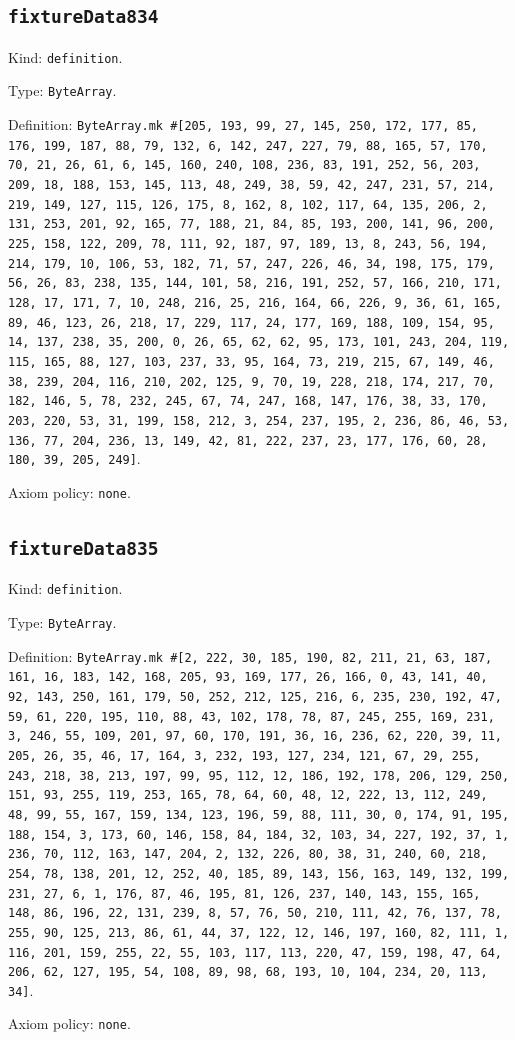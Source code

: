 \documentclass[11pt]{article}
\begin{document}
\subsection*{\texttt{fixtureData834}}
\noindent Kind: \texttt{definition}.\par
\noindent Type: \texttt{ByteArray}.\par
\noindent Definition: \texttt{ByteArray.mk \#[205, 193, 99, 27, 145, 250, 172, 177, 85, 176, 199, 187, 88, 79, 132, 6, 142, 247, 227, 79, 88, 165, 57, 170, 70, 21, 26, 61, 6, 145, 160, 240, 108, 236, 83, 191, 252, 56, 203, 209, 18, 188, 153, 145, 113, 48, 249, 38, 59, 42, 247, 231, 57, 214, 219, 149, 127, 115, 126, 175, 8, 162, 8, 102, 117, 64, 135, 206, 2, 131, 253, 201, 92, 165, 77, 188, 21, 84, 85, 193, 200, 141, 96, 200, 225, 158, 122, 209, 78, 111, 92, 187, 97, 189, 13, 8, 243, 56, 194, 214, 179, 10, 106, 53, 182, 71, 57, 247, 226, 46, 34, 198, 175, 179, 56, 26, 83, 238, 135, 144, 101, 58, 216, 191, 252, 57, 166, 210, 171, 128, 17, 171, 7, 10, 248, 216, 25, 216, 164, 66, 226, 9, 36, 61, 165, 89, 46, 123, 26, 218, 17, 229, 117, 24, 177, 169, 188, 109, 154, 95, 14, 137, 238, 35, 200, 0, 26, 65, 62, 62, 95, 173, 101, 243, 204, 119, 115, 165, 88, 127, 103, 237, 33, 95, 164, 73, 219, 215, 67, 149, 46, 38, 239, 204, 116, 210, 202, 125, 9, 70, 19, 228, 218, 174, 217, 70, 182, 146, 5, 78, 232, 245, 67, 74, 247, 168, 147, 176, 38, 33, 170, 203, 220, 53, 31, 199, 158, 212, 3, 254, 237, 195, 2, 236, 86, 46, 53, 136, 77, 204, 236, 13, 149, 42, 81, 222, 237, 23, 177, 176, 60, 28, 180, 39, 205, 249]}.\par
\noindent Axiom policy: \texttt{none}.\par
\subsection*{\texttt{fixtureData835}}
\noindent Kind: \texttt{definition}.\par
\noindent Type: \texttt{ByteArray}.\par
\noindent Definition: \texttt{ByteArray.mk \#[2, 222, 30, 185, 190, 82, 211, 21, 63, 187, 161, 16, 183, 142, 168, 205, 93, 169, 177, 26, 166, 0, 43, 141, 40, 92, 143, 250, 161, 179, 50, 252, 212, 125, 216, 6, 235, 230, 192, 47, 59, 61, 220, 195, 110, 88, 43, 102, 178, 78, 87, 245, 255, 169, 231, 3, 246, 55, 109, 201, 97, 60, 170, 191, 36, 16, 236, 62, 220, 39, 11, 205, 26, 35, 46, 17, 164, 3, 232, 193, 127, 234, 121, 67, 29, 255, 243, 218, 38, 213, 197, 99, 95, 112, 12, 186, 192, 178, 206, 129, 250, 151, 93, 255, 119, 253, 165, 78, 64, 60, 48, 12, 222, 13, 112, 249, 48, 99, 55, 167, 159, 134, 123, 196, 59, 88, 111, 30, 0, 174, 91, 195, 188, 154, 3, 173, 60, 146, 158, 84, 184, 32, 103, 34, 227, 192, 37, 1, 236, 70, 112, 163, 147, 204, 2, 132, 226, 80, 38, 31, 240, 60, 218, 254, 78, 138, 201, 12, 252, 40, 185, 89, 143, 156, 163, 149, 132, 199, 231, 27, 6, 1, 176, 87, 46, 195, 81, 126, 237, 140, 143, 155, 165, 148, 86, 196, 22, 131, 239, 8, 57, 76, 50, 210, 111, 42, 76, 137, 78, 255, 90, 125, 213, 86, 61, 44, 37, 122, 12, 146, 197, 160, 82, 111, 1, 116, 201, 159, 255, 22, 55, 103, 117, 113, 220, 47, 159, 198, 47, 64, 206, 62, 127, 195, 54, 108, 89, 98, 68, 193, 10, 104, 234, 20, 113, 34]}.\par
\noindent Axiom policy: \texttt{none}.\par
\end{document}
